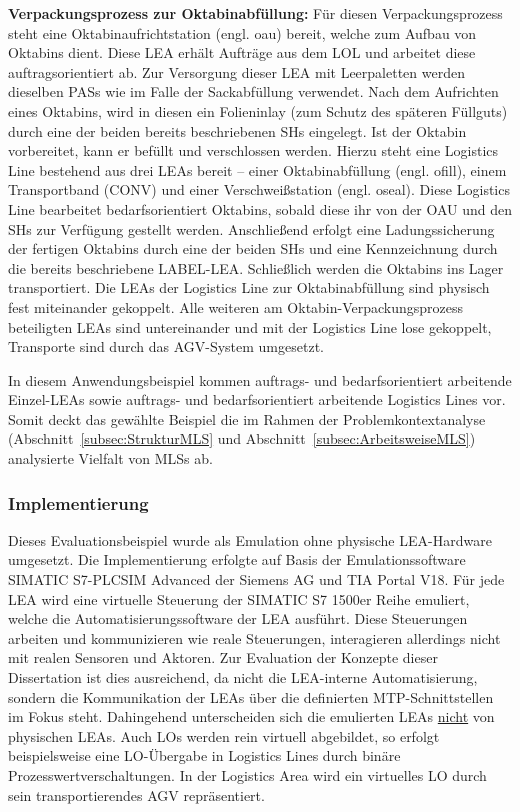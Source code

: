 \textbf{Verpackungsprozess zur Oktabinabfüllung:} Für diesen Verpackungsprozess steht eine Oktabinaufrichtstation (engl. \gls{oau}) bereit, welche zum Aufbau von Oktabins dient. Diese LEA erhält Aufträge aus dem LOL und arbeitet diese auftragsorientiert ab. Zur Versorgung dieser LEA mit Leerpaletten werden dieselben PASs wie im Falle der Sackabfüllung verwendet. Nach dem Aufrichten eines Oktabins, wird in diesen ein Folieninlay (zum Schutz des späteren Füllguts) durch eine der beiden bereits beschriebenen SHs eingelegt. Ist der Oktabin vorbereitet, kann er befüllt und verschlossen werden. Hierzu steht eine Logistics Line bestehend aus drei LEAs bereit -- einer Oktabinabfüllung (engl. \gls{ofill}), einem Transportband (CONV) und einer Verschweißstation (engl. \gls{oseal}). Diese Logistics Line bearbeitet bedarfsorientiert Oktabins, sobald diese ihr von der OAU und den SHs zur Verfügung gestellt werden. Anschließend erfolgt eine Ladungssicherung der fertigen Oktabins durch eine der beiden SHs und eine Kennzeichnung durch die bereits beschriebene LABEL-LEA. Schließlich werden die Oktabins ins Lager transportiert. Die LEAs der Logistics Line zur Oktabinabfüllung sind physisch fest miteinander gekoppelt. Alle weiteren am Oktabin-Verpackungsprozess beteiligten LEAs sind untereinander und mit der Logistics Line lose gekoppelt, Transporte sind durch das AGV-System umgesetzt.

In diesem Anwendungsbeispiel kommen auftrags- und bedarfsorientiert arbeitende Einzel-LEAs sowie auftrags- und bedarfsorientiert arbeitende Logistics Lines vor. Somit deckt das gewählte Beispiel die im Rahmen der Problemkontextanalyse (Abschnitt~\ref{subsec:StrukturMLS} und Abschnitt~\ref{subsec:ArbeitsweiseMLS}) analysierte Vielfalt von MLSs ab.

\subsubsection{Implementierung}

Dieses Evaluationsbeispiel wurde als Emulation ohne physische LEA-Hardware umgesetzt. Die Implementierung erfolgte auf Basis der Emulationssoftware SIMATIC S7-PLCSIM Advanced der Siemens AG und TIA Portal V18. Für jede LEA wird eine virtuelle Steuerung der SIMATIC S7 1500er Reihe emuliert, welche die Automatisierungssoftware der LEA ausführt. Diese Steuerungen arbeiten und kommunizieren wie reale Steuerungen, interagieren allerdings nicht mit realen Sensoren und Aktoren. Zur Evaluation der Konzepte dieser Dissertation ist dies ausreichend, da nicht die LEA-interne Automatisierung, sondern die Kommunikation der LEAs über die definierten MTP-Schnittstellen im Fokus steht. Dahingehend unterscheiden sich die emulierten LEAs \underline{nicht} von physischen LEAs. Auch LOs werden rein virtuell abgebildet, so erfolgt beispielsweise eine LO-Übergabe in Logistics Lines durch binäre Prozesswertverschaltungen. In der Logistics Area wird ein virtuelles LO durch sein transportierendes AGV repräsentiert.

